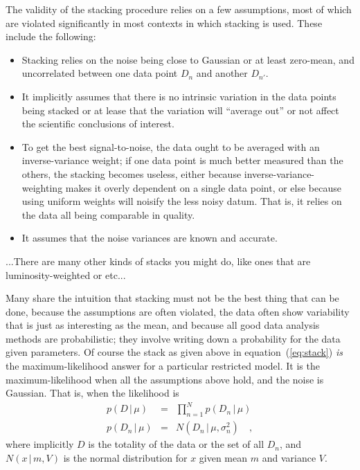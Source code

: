 \documentclass[12pt]{article}
\newcommand{\equationname}{equation}
\newcommand{\given}{\,|\,}
\begin{document}
The validity of the stacking procedure relies on a few assumptions,
most of which are violated significantly in most contexts in which
stacking is used.  These include the following:
\begin{itemize}
\item Stacking relies on the noise being close to Gaussian or at least
  zero-mean, and uncorrelated between one data point $D_n$ and another
  $D_{n'}$.
\item It implicitly assumes that there is no intrinsic variation in
  the data points being stacked or at lease that the variation will
  ``average out'' or not affect the scientific conclusions of
  interest.
\item To get the best signal-to-noise, the data ought to be averaged
  with an inverse-variance weight; if one data point is much better
  measured than the others, the stacking becomes useless, either
  because inverse-variance-weighting makes it overly dependent on a
  single data point, or else because using uniform weights will
  noisify the less noisy datum.  That is, it relies on the data all
  being comparable in quality.
\item It assumes that the noise variances are known and accurate.
\end{itemize}

...There are many other kinds of stacks you might do, like ones that
are luminosity-weighted or etc...

Many share the intuition that stacking must not be the best thing that
can be done, because the assumptions are often violated, the data
often show variability that is just as interesting as the mean, and
because all good data analysis methods are probabilistic; they involve
writing down a probability for the data given parameters.  Of course
the stack as given above in \equationname~(\ref{eq:stack}) \emph{is}
the maximum-likelihood answer for a particular restricted model.  It
is the maximum-likelihood when all the assumptions above hold, and the
noise is Gaussian.  That is, when the likelihood is
\begin{eqnarray}
p(D\given\mu)
 &=&
\prod_{n=1}^N p(D_n\given\mu)
\\
p(D_n\given\mu)
 &=&
N(D_n\given\mu,\sigma^2_n)
\quad ,
\end{eqnarray}
where implicitly $D$ is the totality of the data or the set of all
$D_n$, and $N(x\given m,V)$ is the normal distribution for $x$ given
mean $m$ and variance $V$.
\end{document}
